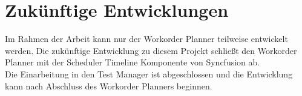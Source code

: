 \section{Zukünftige Entwicklungen}
Im Rahmen der Arbeit kann nur der Workorder Planner teilweise entwickelt werden. Die zukünftige Entwicklung zu diesem Projekt schließt den Workorder Planner mit der Scheduler Timeline Komponente von Syncfusion ab.\\
Die Einarbeitung in den Test Manager ist abgeschlossen und die Entwicklung kann nach Abschluss des Workorder Planners beginnen.
